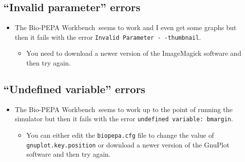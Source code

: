 \documentclass[11pt,a4paper]{article}
\newcommand{\BioPEPA}{Bio-PEPA}
\newcommand{\BPWB}{{\BioPEPA} Workbench}
\begin{document}
\subsection{``Invalid parameter'' errors}

\begin{itemize}
\item The \BPWB\ seems to work and I even get some graphs but then it fails
      with the error 
      \texttt{Invalid Parameter - -thumbnail}.
      \begin{itemize}
      \item You need to download a newer version of the ImageMagick software
            and then try again.
      \end{itemize}
\end{itemize}


\subsection{``Undefined variable'' errors}

\begin{itemize}
\item The \BPWB\ seems to work up to the point of running the
  simulator but then it fails
      with the error 
      \texttt{undefined variable: bmargin}.
      \begin{itemize}
      \item You can either edit the \texttt{biopepa.cfg}
            file to change the value of 
            \texttt{gnuplot.key.position}
            or download a newer version of the 
            GnuPlot software
            and then try again.
      \end{itemize}
\end{itemize}

\printindex
\end{document}
